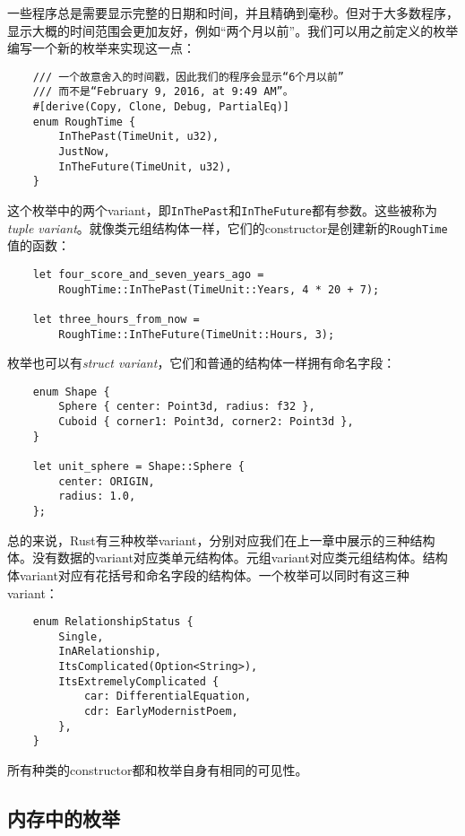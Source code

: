 一些程序总是需要显示完整的日期和时间，并且精确到毫秒。但对于大多数程序，显示大概的时间范围会更加友好，例如“两个月以前”。我们可以用之前定义的枚举编写一个新的枚举来实现这一点：
\begin{verbatim}
    /// 一个故意舍入的时间戳，因此我们的程序会显示“6个月以前”
    /// 而不是“February 9, 2016, at 9:49 AM”。
    #[derive(Copy, Clone, Debug, PartialEq)]
    enum RoughTime {
        InThePast(TimeUnit, u32),
        JustNow,
        InTheFuture(TimeUnit, u32),
    }
\end{verbatim}

这个枚举中的两个variant，即\texttt{InThePast}和\texttt{InTheFuture}都有参数。这些被称为\emph{tuple variant}。就像类元组结构体一样，它们的constructor是创建新的\texttt{RoughTime}值的函数：
\begin{verbatim}
    let four_score_and_seven_years_ago =
        RoughTime::InThePast(TimeUnit::Years, 4 * 20 + 7);

    let three_hours_from_now =
        RoughTime::InTheFuture(TimeUnit::Hours, 3);
\end{verbatim}

枚举也可以有\emph{struct variant}，它们和普通的结构体一样拥有命名字段：
\begin{verbatim}
    enum Shape {
        Sphere { center: Point3d, radius: f32 },
        Cuboid { corner1: Point3d, corner2: Point3d },
    }

    let unit_sphere = Shape::Sphere {
        center: ORIGIN,
        radius: 1.0,
    };
\end{verbatim}

总的来说，Rust有三种枚举variant，分别对应我们在上一章中展示的三种结构体。没有数据的variant对应类单元结构体。元组variant对应类元组结构体。结构体variant对应有花括号和命名字段的结构体。一个枚举可以同时有这三种variant：
\begin{verbatim}
    enum RelationshipStatus {
        Single,
        InARelationship,
        ItsComplicated(Option<String>),
        ItsExtremelyComplicated {
            car: DifferentialEquation, 
            cdr: EarlyModernistPoem,
        },
    }
\end{verbatim}

所有种类的constructor都和枚举自身有相同的可见性。

\subsection{内存中的枚举}




